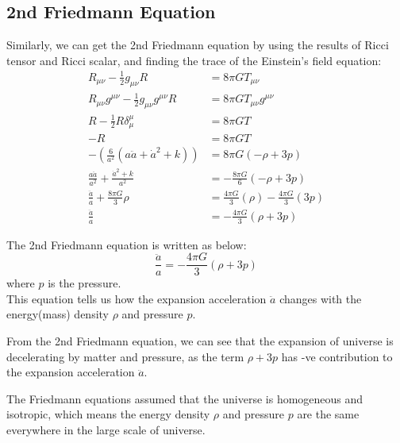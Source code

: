 \clearpage
\subsection{2nd Friedmann Equation}
\begin{foundation}
    Similarly, we can get the 2nd Friedmann equation by using the results of Ricci tensor and Ricci scalar, and finding the trace of the Einstein's field equation:
    \begin{align*}
        R_{\mu\nu} - \frac{1}{2}g_{\mu\nu}R &= 8\pi G T_{\mu\nu} \\
        R_{\mu\nu}g^{\mu\nu} - \frac{1}{2}g_{\mu\nu}g^{\mu\nu}R &= 8\pi G T_{\mu\nu}g^{\mu\nu} \\
        R - \frac{1}{2} R \delta^\mu_\mu &= 8\pi G T \\
        - R &= 8\pi G T \\
        - (\frac{6}{a^2}\left( a \ddot{a} + \dot{a}^2 + k \right) ) &= 8\pi G (- \rho + 3p) \\
        \frac{a \ddot{a}}{a^2} + \frac{\dot{a}^2 + k}{a^2} &= - \frac{8\pi G}{6}(- \rho + 3p) \\
        \frac{\ddot{a}}{a} + \frac{8\pi G}{3}\rho &= \frac{4\pi G}{3}(\rho) - \frac{4\pi G}{3}(3p) \\
        \frac{\ddot{a}}{a} &= -\frac{4\pi G}{3}(\rho + 3p)
    \end{align*}
\end{foundation}

\bigskip \noindent
\begin{theory}
    The 2nd Friedmann equation is written as below:
    \[
        \frac{\ddot{a}}{a} = -\frac{4\pi G}{3}(\rho + 3p) 
    \]
    where $p$ is the pressure. \\

    This equation tells us how the expansion acceleration $\ddot{a}$ changes with the energy(mass) density $\rho$ and pressure $p$.
\end{theory}

\bigskip \noindent
\begin{intuition}
    From the 2nd Friedmann equation, we can see that the expansion of universe is decelerating by matter and pressure, as the term $\rho + 3p$ has -ve contribution to the expansion acceleration $\ddot{a}$. 
\end{intuition}

\bigskip \noindent
\begin{remark}
    The Friedmann equations assumed that the universe is homogeneous and isotropic, which means the energy density $\rho$ and pressure $p$ are the same everywhere in the large scale of universe.
\end{remark}


